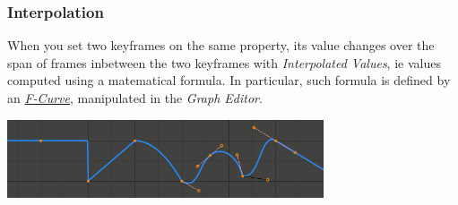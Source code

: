 \documentclass{article}
\begin{document}
\subsubsection{Interpolation}
When you set two keyframes on the same property, its value changes over the span of frames inbetween the two keyframes with \textit{Interpolated Values}, ie values computed using
a matematical formula. In particular, such formula is defined by an \href{https://docs.blender.org/manual/en/4.3/editors/graph_editor/fcurves/introduction.html}{\textit{F-Curve}},
manipulated in the \textit{Graph Editor}.
\begin{center}
    \includegraphics[width=0.7\textwidth]{blender_docs_images/animation_keyframes_introduction_curves.png}
\end{center}
\end{document}
